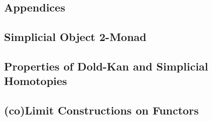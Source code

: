 \begin{subappendices}
    \section{Appendices}

    \subsection{Simplicial Object 2-Monad}\label{sec:simpMon}

    
    
    \subsection{Properties of Dold-Kan and Simplicial Homotopies}\label{sec:doldKan}

    


    \subsection{(co)Limit Constructions on Functors}\label{sec:colimFuncs}

    
\end{subappendices}